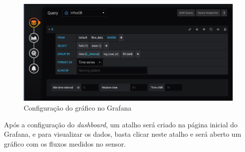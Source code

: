 \begin{figure}[htbp]
	\centering
	\includegraphics[width=1\linewidth]{figuras/grafanaconf.png}
	\caption{Configuração do gráfico no Grafana}
	\label{fig:grafanaconf}
\end{figure}

Após a configuração do \textit{dashboard}, um atalho será criado na página inicial do Grafana, e para visualizar os dados, basta clicar neste atalho e será aberto um gráfico com os fluxos medidos no sensor.

